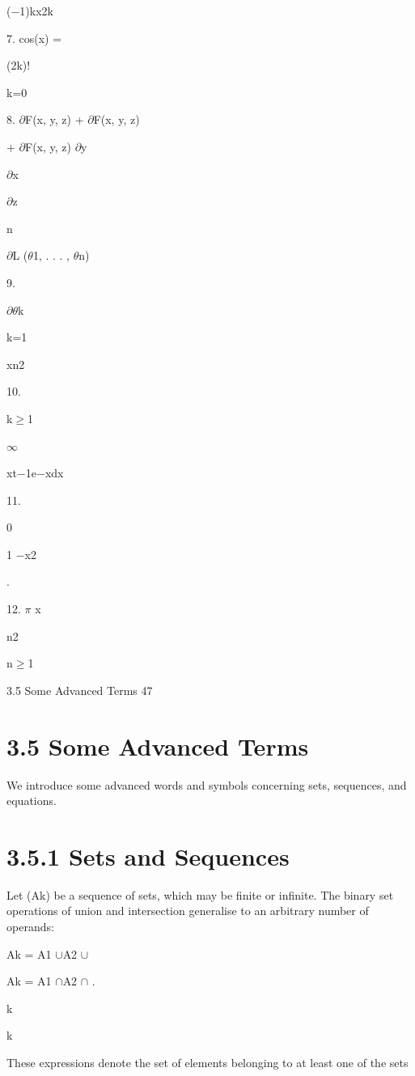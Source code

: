 \documentclass[11pt]{article}
\theoremstyle{plain}
\theoremstyle{definition}
\begin{document}
($-$1)kx2k

7. cos(x) =

(2k)!

k=0

8. $\partial$F(x, y, z) + $\partial$F(x, y, z)

+ $\partial$F(x, y, z) $\partial$y

$\partial$x

$\partial$z

n

$\partial$L ($\theta$1, . . . , $\theta$n)

9.

$\partial$$\theta$k

k=1

xn2

10.

k$\geq$1

$\infty$

xt$-$1e$-$xdx

11.

0

1 $-$x2

.

12. $\pi$ x

n2

n$\geq$1

3.5 Some Advanced Terms 47

\section{3.5 Some Advanced Terms}

We introduce some advanced words and symbols concerning sets, sequences, and equations.

\section{3.5.1 Sets and Sequences}

Let (Ak) be a sequence of sets, which may be finite or infinite. The binary set operations of union and intersection generalise to an arbitrary number of operands:

Ak = A1 $\cup$A2 $\cup$\textperiodcentered{} \textperiodcentered{} \textperiodcentered{}

Ak = A1 $\cap$A2 $\cap$\textperiodcentered{} \textperiodcentered{} \textperiodcentered{} .

k

k

These expressions denote the set of elements belonging to at least one of the sets
\end{document}
